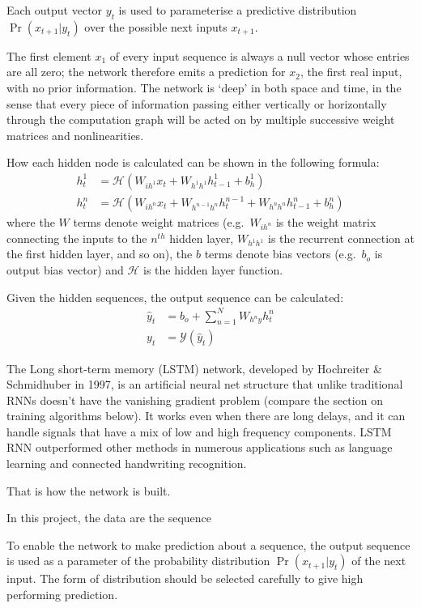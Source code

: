 \documentclass{article} %
\begin{document}
Each output vector $y_t$ is used to parameterise a predictive distribution $\Pr(x_{t+1}|y_t)$ over the possible next inputs $x_{t+1}$.

The first element $x_1$ of every input sequence is always a null vector whose entries are all zero; the network therefore emits a prediction for $x_2$, the first real input, with no prior information.
The network is `deep' in both space and time, in the sense that every piece of information passing either vertically or horizontally through the computation graph will be acted on by multiple successive weight matrices and nonlinearities.

How each hidden node is calculated can be shown in the following formula: 
\begin{align}
\label{eq:pred_hidden}
h^1_t &= \mathcal{H}\left(W_{i h^1} x_t + W_{h^{1}h^{1}} h^1_{t-1} + b_{h}^1 \right)\\
h^n_t &= \mathcal{H}\left(W_{i h^n} x_t + W_{h^{n-1}h^{n}} h^{n-1}_t + W_{h^{n}h^{n}} h^n_{t-1} + b_h^n \right)
\end{align} 
where the $W$ terms denote weight matrices (e.g.\ $W_{i h^n}$ is the weight matrix connecting the inputs to the $n^{th}$ hidden layer, $W_{h^{1}h^{1}}$ is the recurrent connection at the first hidden layer, and so on), the $b$ terms denote bias vectors (e.g.\ $b_o$ is output bias vector) and $\mathcal{H}$ is the hidden layer function. 

Given the hidden sequences, the output sequence can be calculated: 
\begin{align}
\label{eq:pred_output}
\hat{y}_t &= b_o + \sum_{n=1}^N{W_{h^n y} h^n_t}\\
y_t &= \mathcal{Y}(\hat{y}_t)	
\end{align}

The Long short-term memory (LSTM) network, developed by Hochreiter \& Schmidhuber in 1997, is an artificial neural net structure that unlike traditional RNNs doesn't have the vanishing gradient problem (compare the section on training algorithms below). It works even when there are long delays, and it can handle signals that have a mix of low and high frequency components. LSTM RNN outperformed other methods in numerous applications such as language learning and connected handwriting recognition.


That is how the network is built. 

In this project, the data are the sequence 

To enable the network to make prediction about a sequence, the output sequence is used as a parameter of the probability distribution $\Pr(x_{t+1}|y_t)$ of the next input. The form of distribution should be selected carefully to give high performing prediction. 
\end{document}
